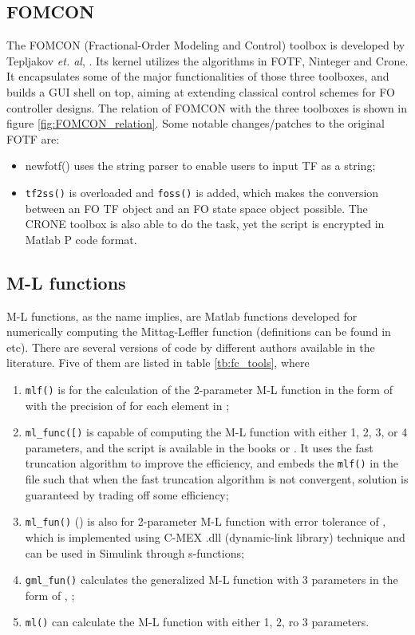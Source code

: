 \documentclass[11pt]{tCON2e}
\theoremstyle{plain}\newtheorem{theorem}{Theorem}
\theoremstyle{definition}
\theoremstyle{remark}
\begin{document}
\subsection{FOMCON}
The FOMCON (Fractional-Order Modeling and Control) toolbox is developed by Tepljakov \emph{et. al}, \cite{ref:FOMCON}. Its kernel utilizes the algorithms in FOTF, Ninteger and Crone. It encapsulates some of the major functionalities of those three toolboxes, and builds a GUI shell on top, aiming at extending classical control schemes for FO controller designs. The relation of FOMCON with the three toolboxes is shown in figure \ref{fig:FOMCON_relation}. Some notable changes/patches to the original FOTF are:
\vspace{-0.1cm}
\begin{itemize}
    \item[\tiny] {\ttfamily newfotf()} uses the string parser to enable users to input TF as a string;
\item[\tiny] {\tt tf2ss()} is overloaded and {\tt foss()} is added, which makes the conversion between an FO TF object and an FO state space object possible. The CRONE toolbox is also able to do the task, yet the script is encrypted in Matlab P code format.
\end{itemize}




\subsection{M-L functions}
M-L functions, as the name implies, are Matlab functions developed for numerically computing the Mittag-Leffler function (definitions can be found in \cite{ref:Magin} etc). There are several versions of code by different authors available in the literature. Five of them are listed in table \ref{tb:fc_tools}, where
\begin{enumerate}
    \item {\tt mlf()} is for the calculation of the 2-parameter M-L function in the form of  with the precision of  for each element in ;
    \item {\tt ml\_func([)} is capable of computing the M-L function with either 1, 2, 3, or 4 parameters, and the script is available in the books \cite{ref:Xuedingyu} or \cite{ref:Monje}. It uses the fast truncation algorithm to improve the efficiency, and embeds the {\tt mlf()} in the file such that when the fast truncation algorithm is not convergent, solution is guaranteed by trading off some efficiency;
    \item {\tt ml\_fun()} () is also for 2-parameter M-L function with error tolerance of , which is implemented using C-MEX .dll (dynamic-link library) technique and can be used in Simulink through s-functions;
    \item {\tt gml\_fun()} calculates the generalized M-L function with 3 parameters in the form of , \cite{ref:generalized_ML};
    \item {\tt ml()} can calculate the M-L function with either 1, 2, ro 3 parameters.
\end{enumerate}
\end{document}
